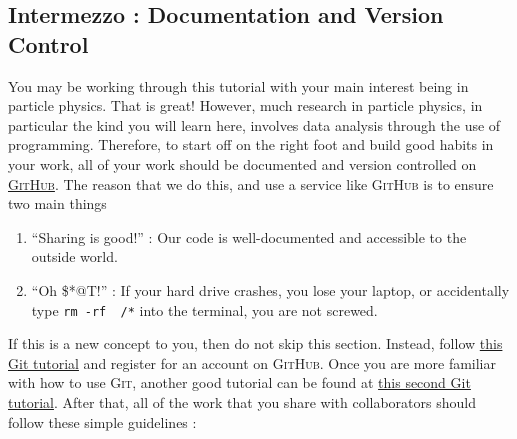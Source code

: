 \documentclass[UKenglish,texlive=2016]{\ATLASLATEXPATH atlasdoc}
\begin{document}
\begin{center}
\end{center}

\subsection{Intermezzo : Documentation and Version Control}
You may be working through this tutorial with your main interest being in particle physics.  That is great!  However, much research in particle physics, in particular the kind you will learn here, involves data analysis through the use of programming.  Therefore, to start off on the right foot and build good habits in your work, all of your work should be documented and version controlled on \href{https://github.com/}{\textsc{GitHub}}.  The reason that we do this, and use a service like \textsc{GitHub} is to ensure two main things 

\begin{enumerate}
\item ``Sharing is good!'' : Our code is well-documented and accessible to the outside world.  
\item ``Oh \$*@T!'' : If your hard drive crashes, you lose your laptop, or accidentally type \texttt{rm -rf ~/*} into the terminal, you are not screwed.
\end{enumerate}

If this is a new concept to you, then do not skip this section.  Instead, follow \href{https://try.github.io}{this Git tutorial} and register for an account on \textsc{GitHub}.  Once you are more familiar with how to use \textsc{Git}, another good tutorial can be found at \href{http://learngitbranching.js.org/}{this second Git tutorial}.  After that, all of the work that you share with collaborators should follow these simple guidelines :
\end{document}
